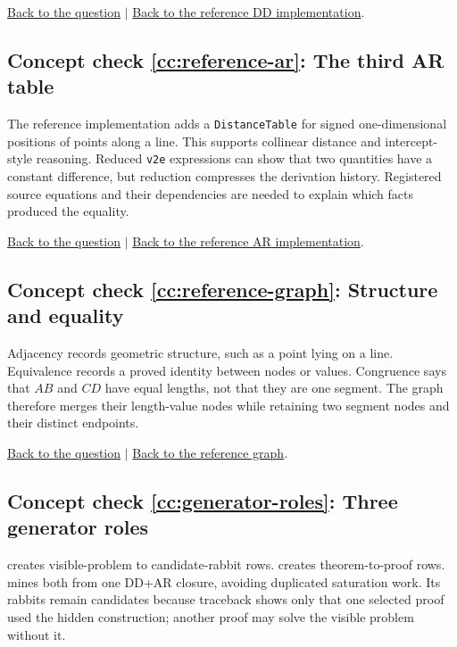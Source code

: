 \documentclass[reqno]{amsart}
\DeclareMathOperator{\1}{\textbf{1}}
\begin{document}
\noindent\hyperlink{ccq:reference-dd}{Back to the question}
$\mid$
\hyperref[sec: dd.py]{Back to the reference DD implementation}.

\hypertarget{cca:reference-ar}{}
\subsection*{Concept check \ref{cc:reference-ar}: The third AR table}

The reference implementation adds a \texttt{DistanceTable} for signed
one-dimensional positions of points along a line. This supports collinear
distance and intercept-style reasoning. Reduced \verb|v2e| expressions can
show that two quantities have a constant difference, but reduction compresses
the derivation history. Registered source equations and their dependencies
are needed to explain which facts produced the equality.

\noindent\hyperlink{ccq:reference-ar}{Back to the question}
$\mid$
\hyperref[sec: ar.py]{Back to the reference AR implementation}.

\hypertarget{cca:reference-graph}{}
\subsection*{Concept check \ref{cc:reference-graph}: Structure and equality}

Adjacency records geometric structure, such as a point lying on a line.
Equivalence records a proved identity between nodes or values. Congruence says
that $AB$ and $CD$ have equal lengths, not that they are one segment. The graph
therefore merges their length-value nodes while retaining two segment nodes
and their distinct endpoints.

\noindent\hyperlink{ccq:reference-graph}{Back to the question}
$\mid$
\hyperref[sec: graph.py]{Back to the reference graph}.

\hypertarget{cca:generator-roles}{}
\subsection*{Concept check \ref{cc:generator-roles}: Three generator roles}

 creates visible-problem to candidate-rabbit
rows.  creates theorem-to-proof rows.
 mines both from one DD+AR closure, avoiding
duplicated saturation work. Its rabbits remain candidates because traceback
shows only that one selected proof used the hidden construction; another proof
may solve the visible problem without it.
\end{document}
